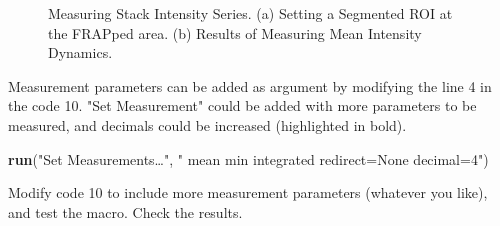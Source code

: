 \begin{figure}[htbp]
 \centering
 \quad
 \caption{Measuring Stack Intensity Series. (a) Setting a Segmented ROI at the FRAPped area. (b) Results of Measuring Mean Intensity Dynamics.}
 \label{fig:frapresults}
\end{figure}


Measurement parameters can be added as argument by modifying the line 4 in the code 10. "Set Measurement" could be added with more parameters to be measured, and decimals could be increased (highlighted in bold).
\begin{indentCom}
\textbf{run}("Set Measurements\ldots", "  mean min integrated redirect=None decimal=4")
\end{indentCom}

\begin{indentexercise}{1}
Modify code 10 to include more measurement parameters (whatever you like), and test the macro. Check the results. 
\end{indentexercise}


